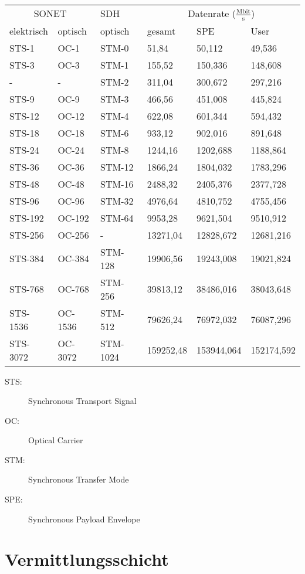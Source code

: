 \documentclass[a4paper]{article}
\begin{document}
\begin{tabular}{|ll|l|lll|}
    \hline
    \multicolumn{2}{|c|}{SONET} & SDH & \multicolumn{3}{|c|}{Datenrate ($\frac{\text{Mbit}}{\text{s}}$)}\\
    elektrisch & optisch & optisch & gesamt & SPE & User\\
    \hline
    STS-1 & OC-1 & STM-0 & 51,84 & 50,112 & 49,536 \\
    STS-3 & OC-3 & STM-1 & 155,52 & 150,336 & 148,608 \\
    - & - & STM-2 & 311,04 & 300,672 & 297,216 \\
    STS-9 & OC-9 & STM-3 & 466,56 & 451,008 & 445,824 \\
    STS-12 & OC-12 & STM-4 & 622,08 & 601,344 & 594,432 \\
    STS-18 & OC-18 & STM-6 & 933,12 & 902,016 & 891,648 \\
    STS-24 & OC-24 & STM-8 & 1244,16 & 1202,688 & 1188,864 \\
    STS-36 & OC-36 & STM-12 & 1866,24 & 1804,032 & 1783,296 \\
    STS-48 & OC-48 & STM-16 & 2488,32 & 2405,376 & 2377,728 \\
    STS-96 & OC-96 & STM-32 & 4976,64 & 4810,752 & 4755,456 \\
    STS-192 & OC-192 & STM-64 & 9953,28 & 9621,504 & 9510,912 \\
    STS-256 & OC-256 & - & 13271,04 & 12828,672 & 12681,216 \\
    STS-384 & OC-384 & STM-128 & 19906,56 & 19243,008 & 19021,824 \\
    STS-768 & OC-768 & STM-256 & 39813,12 & 38486,016 & 38043,648 \\
    STS-1536 & OC-1536 & STM-512 & 79626,24 & 76972,032 & 76087,296 \\
    STS-3072 & OC-3072 & STM-1024 & 159252,48 & 153944,064 & 152174,592\\
    \hline
\end{tabular}
%
\begin{description}
    \item[STS:] Synchronous Transport Signal
    \item[OC:] Optical Carrier
    \item[STM:] Synchronous Transfer Mode
    \item[SPE:] Synchronous Payload Envelope
\end{description}

\section{Vermittlungsschicht}
\end{document}
